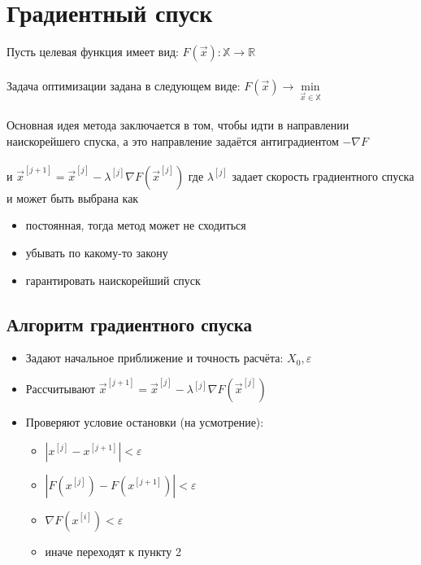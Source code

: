 \documentclass{article}
\begin{document}
    \newpage
    \section{Градиентный спуск}
    Пусть целевая функция имеет вид:
    $F(\vec{x}): \mathbb{X} \rightarrow \mathbb{R}$\\\\
    Задача оптимизации задана в следующем виде:
    $F(\vec{x}) \rightarrow    \underset{\vec{x} \in \mathbb{X}}{\min}$\\\\
    Основная идея метода заключается в том, чтобы идти в направлении наискорейшего спуска, а это направление задаётся антиградиентом $-\nabla F$\\\\
    и $\vec{x}^{[j+1]}=\vec{x}^{[j]}-\lambda^{[j]} \nabla F\left(\vec{x}^{[j]}\right)$
    где $\lambda ^{[j]}$ задает скорость градиентного спуска и может быть выбрана как
    \begin{itemize}
        \item постоянная, тогда метод может не сходиться
        \item убывать по какому-то закону
        \item гарантировать наискорейший спуск
    \end{itemize}

    \subsection{Алгоритм градиентного спуска}
    \begin{itemize}
        \item Задают начальное приближение и точность расчёта: $X_0, \varepsilon$
        \item Рассчитывают $\vec{x}^{[j+1]}=\vec{x}^{[j]}-\lambda^{[j]} \nabla F\left(\vec{x}^{[j]}\right)$
        \item Проверяют условие остановки (на усмотрение):
        \begin{itemize}
            \item $|x^{[j]}-x^{[j+1]}|<\varepsilon$
            \item $|F(x^{[j]})-F(x^{[j+1]})|
            <\varepsilon$
            \item $\nabla F(x^{[i]})<\varepsilon$
            \item иначе переходят к пункту 2
        \end{itemize}
    \end{itemize}
\end{document}
